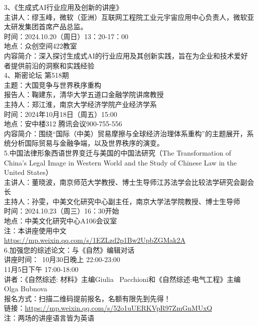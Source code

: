 \documentclass[letterpaper, 12pt]{article}
\begin{document}
\begin{multicols}{2}
3、《生成式AI行业应用及创新的讲座》\\
主讲人：缪玉峰，微软（亚洲）互联网工程院工业元宇宙应用中心负责人，微软亚太研发集团首席产品总监。\\
时间：2024.10.20（周日）13：20-17：00\\
地点：众创空间422教室\\
内容简介：深入探讨生成式AI的行业应用及其创新实践，旨在为企业和技术爱好者提供前沿的洞察和实践经验\\

4、斯密论坛 第518期\\
主题：大国竞争与世界秩序重构\\
报告人：鞠建东，清华大学五道口金融学院讲席教授\\
主持人：郑江淮，南京大学经济学院产业经济学系\\
时间：2024年10月18日（周五）15:00\\
地点：安中楼312 腾讯会议900-755-556\\
内容简介：围绕“国际（中美）贸易摩擦与全球经济治理体系重构”的主题展开，系统分析国际贸易与金融争端，以及世界秩序的演变。\\

5.中国法律形象西语世界变迁与美国的中国法研究（The Transformation of China's Legal Image in Western World and the Study of Chinese Law in the United States）\\
主讲人：董晓波，南京师范大学教授、博士生导师江苏法学会比较法学研究会副会长\\
主持人：孙雯，中美文化研究中心副主任，南京大学法学院教授、博士生导师\\
时间：2024.10.23（周三）16：30开始\\
地点：中美文化研究中心A106会议室\\
注：本讲座使用中文\\
\url{https://mp.weixin.qq.com/s/1EZLzd2p1Bw2UpbZGMak2A}\\

6.加强您的综述论文：与《自然》编辑对话\\
讲座时间： 10月30日晚上 22:00-23:00\\
         11月5日下午 17:00-18:00\\
讲者：《自然综述: 材料》主编Giulia  Pacchioni和《自然综述:电气工程》主编Olga Bubnova\\
报名方式：扫描二维码提前报名，名额有限先到先得！\\
链接：\url{https://mp.weixin.qq.com/s/52o1uUERKVpR97ZmGnMUxQ}\\
注：两场的讲座语言皆为英语\\

\end{multicols}
\end{document}
